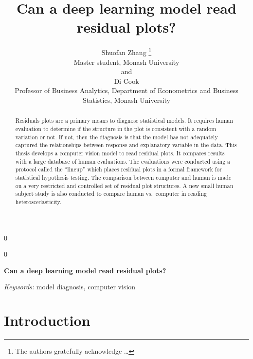 \documentclass[12pt]{article}
\newcommand{\blind}{0}
\begin{document}
\def\spacingset#1{\renewcommand{\baselinestretch}%
{#1}\small\normalsize} \spacingset{1}



\blind
{
  \title{\bf Can a deep learning model read residual plots?}

  \author{
        Shuofan Zhang \thanks{The authors gratefully acknowledge \ldots{}} \\
    Master student, Monash University\\
     and \\     Di Cook \\
    Professor of Business Analytics, Department of Econometrics and Business
    Statistics, Monash University\\
      }
  \maketitle
} \fi

\blind
{
  \bigskip
  \bigskip
  \bigskip
  \begin{center}
    {\LARGE\bf Can a deep learning model read residual plots?}
  \end{center}
  \medskip
} \fi

\bigskip
\begin{abstract}
Residuals plots are a primary means to diagnose statistical models. It
requires human evaluation to determine if the structure in the plot is
consistent with a random variation or not. If not, then the diagnosis is
that the model has not adequately captured the relationships between
response and explanatory variable in the data. This thesis develops a
computer vision model to read residual plots. It compares results with a
large database of human evaluations. The evaluations were conducted
using a protocol called the ``lineup'' which places residual plots in a
formal framework for statistical hypothesis testing. The comparison
between computer and human is made on a very restricted and controlled
set of residual plot structures. A new small human subject study is also
conducted to compare human vs.~computer in reading heteroscedasticity.
\end{abstract}

\noindent%
{\it Keywords:} model diagnosis, computer vision
\vfill

\newpage
\spacingset{1.45} %

\section{Introduction}
\label{sec:intro}
\end{document}
